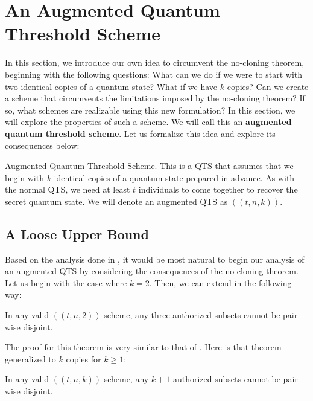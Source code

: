 \chapter{An Augmented Quantum Threshold Scheme}
\label{ch:good-stuff}

In this section, we introduce our own idea to circumvent the no-cloning theorem, beginning with the following questions: What can we do if we were to start with two identical copies of a quantum state? What if we have $k$ copies? Can we create a scheme that circumvents the limitations imposed by the no-cloning theorem? If so, what schemes are realizable using this new formulation? In this section, we will explore the properties of such a scheme. We will call this an \textbf{augmented quantum threshold scheme}. Let us formalize this idea and explore its consequences below:

\theoremstyle{definition}
\begin{definition}{Augmented Quantum Threshold Scheme.}
    \label{defn:augmented-qts}
     This is a QTS that assumes that we begin with $k$ identical copies of a quantum state prepared in advance. As with the normal QTS, we need at least $t$ individuals to come together to recover the secret quantum state. We will denote an augmented QTS as $((t,n,k))$.
\end{definition}

\section{A Loose Upper Bound}

Based on the analysis done in , it would be most natural to begin our analysis of an augmented QTS by considering the consequences of the no-cloning theorem. Let us begin with the case where $k=2$. Then, we can extend  in the following way:

\begin{theorem}
    \label{thm:three-authorized}
    In any valid $((t,n,2))$ scheme, any three authorized subsets cannot be pair-wise disjoint.
\end{theorem}

The proof for this theorem is very similar to that of . Here is that theorem generalized to $k$ copies for $k \geq 1$:

\begin{theorem}
    \label{thm:k-authorized}
    In any valid $((t,n,k))$ scheme, any $k+1$ authorized subsets cannot be pair-wise disjoint.
\end{theorem}


